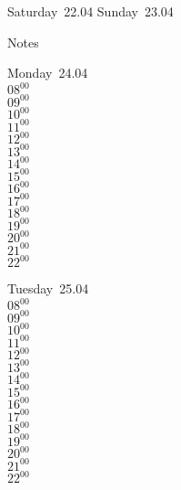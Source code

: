 \documentclass[11pt,a4paper]{book}\usepackage[]{graphicx}\usepackage[]{color}
\begin{document}
\begin{weekendbox}
  Saturday~22.04
  \tcblower
  Sunday~23.04
\end{weekendbox} %
\begin{notebox}
  Notes
\end{notebox}
\clearpage
\begin{headerbox}
\end{headerbox}
\begin{weekdaybox}
  Monday~24.04\\
  { 
  \vfill
  $08^{00}$\\
$09^{00}$\\
$10^{00}$\\
$11^{00}$\\
$12^{00}$\\
$13^{00}$\\
$14^{00}$\\
$15^{00}$\\
$16^{00}$\\
$17^{00}$\\
$18^{00}$\\
$19^{00}$\\
$20^{00}$\\
$21^{00}$\\
$22^{00}$\\
  }
\end{weekdaybox}
\begin{weekdaybox}
  Tuesday~25.04\\
  { 
  \vfill
  $08^{00}$\\
$09^{00}$\\
$10^{00}$\\
$11^{00}$\\
$12^{00}$\\
$13^{00}$\\
$14^{00}$\\
$15^{00}$\\
$16^{00}$\\
$17^{00}$\\
$18^{00}$\\
$19^{00}$\\
$20^{00}$\\
$21^{00}$\\
$22^{00}$\\
  }
\end{weekdaybox}
\end{document}
